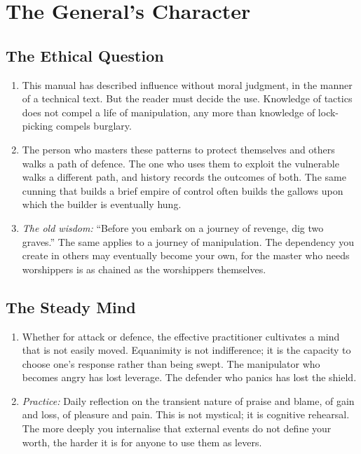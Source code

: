 \documentclass[12pt,a4paper,oneside]{book}
\begin{document}
\chapter{The General's Character}
\section{The Ethical Question}
\begin{enumerate}[leftmargin=*, label=\arabic*.]
\item This manual has described influence without moral judgment, in the manner of a technical text. But the reader must decide the use. Knowledge of tactics does not compel a life of manipulation, any more than knowledge of lock-picking compels burglary.
\item The person who masters these patterns to protect themselves and others walks a path of defence. The one who uses them to exploit the vulnerable walks a different path, and history records the outcomes of both. The same cunning that builds a brief empire of control often builds the gallows upon which the builder is eventually hung.
\item \textit{The old wisdom:} “Before you embark on a journey of revenge, dig two graves.” The same applies to a journey of manipulation. The dependency you create in others may eventually become your own, for the master who needs worshippers is as chained as the worshippers themselves.
\end{enumerate}

\section{The Steady Mind}
\begin{enumerate}[leftmargin=*, label=\arabic*.]
\item Whether for attack or defence, the effective practitioner cultivates a mind that is not easily moved. Equanimity is not indifference; it is the capacity to choose one's response rather than being swept. The manipulator who becomes angry has lost leverage. The defender who panics has lost the shield.
\item \textit{Practice:} Daily reflection on the transient nature of praise and blame, of gain and loss, of pleasure and pain. This is not mystical; it is cognitive rehearsal. The more deeply you internalise that external events do not define your worth, the harder it is for anyone to use them as levers.
\end{enumerate}
\end{document}
